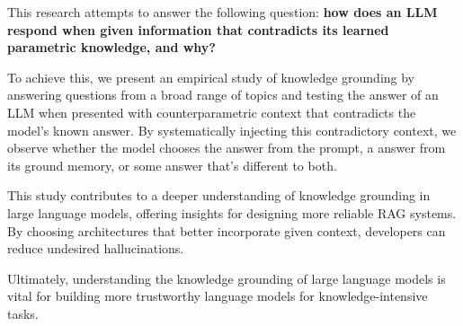 This research attempts to answer the following question: \textbf{how does an LLM respond when given information that contradicts its learned parametric knowledge, and why?}


To achieve this, we present an empirical study of knowledge grounding by answering questions from a broad range of topics and testing the answer of an LLM when presented with counterparametric context that contradicts the model's known answer.
By systematically injecting this contradictory context, we observe whether the model chooses the \Contextual{} answer from the prompt, a \Parametric{} answer from its ground memory, or some \Other{} answer that's different to both.


This study contributes to a deeper understanding of knowledge grounding in large language models, offering insights for designing more reliable RAG systems.
By choosing architectures that better incorporate given context, developers can reduce undesired hallucinations.

Ultimately, understanding the knowledge grounding of large language models is vital for building more trustworthy language models for knowledge-intensive tasks.
